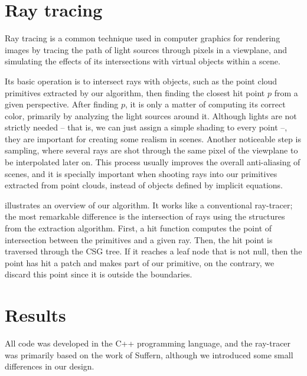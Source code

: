 \documentclass[10pt, conference]{IEEEtran}
\begin{document}
\section{Ray tracing}

Ray tracing is a common technique used in computer graphics for rendering images by tracing the path of light sources through pixels in a viewplane, and simulating the effects of its intersections with virtual objects within a scene.

Its basic operation is to intersect rays with objects, such as the point cloud primitives extracted by our algorithm, then finding the closest hit point $p$ from a given perspective. After finding $p$, it is only a matter of computing its correct color, primarily by analyzing the light sources around it. Although lights are not strictly needed -- that is, we can just assign a simple shading to every point --, they are important for creating some realism in scenes. Another noticeable step is sampling, where several rays are shot through the same pixel of the viewplane to be interpolated later on. This process usually improves the overall anti-aliasing of scenes, and it is specially important when shooting rays into our primitives extracted from point clouds, instead of objects defined by implicit equations.

 illustrates an overview of our algorithm. It works like a conventional ray-tracer; the most remarkable difference is the intersection of rays using the structures from the extraction algorithm. First, a hit function computes the point of intersection between the primitives and a given ray. Then, the hit point is traversed through the CSG tree. If it reaches a leaf node that is not null, then the point has hit a patch and makes part of our primitive, on the contrary, we discard this point since it is outside the boundaries.


\section{Results}

All code was developed in the C++ programming language, and the ray-tracer was primarily based on the work of Suffern\cite{suffern2007ray}, although we introduced some small differences in our design.
\end{document}
